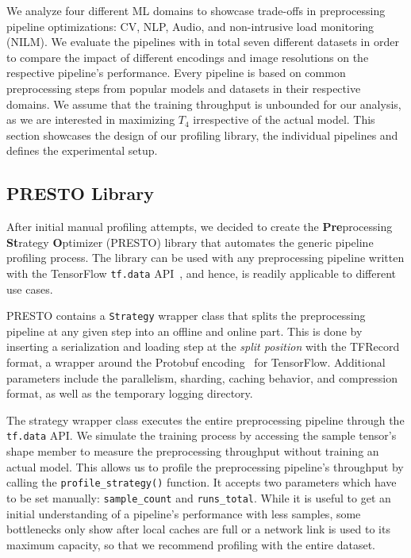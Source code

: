 We analyze four different ML domains to showcase trade-offs in preprocessing pipeline optimizations: CV, NLP, {\color{diff}Audio}, and non-intrusive load monitoring (NILM).
{\color{diff}We evaluate the pipelines with in total seven different datasets in order to compare the impact of different encodings and image resolutions on the respective pipeline's performance.}
Every pipeline is based on common preprocessing steps from popular models and datasets in their respective domains.
We assume that the training throughput is unbounded for our analysis, as we are interested in maximizing $T_4$ irrespective of the actual model.
This section showcases the design of our profiling library, the individual pipelines and defines the experimental setup.

\subsection{PRESTO Library}

After initial manual profiling attempts, we decided to create the \textbf{Pre}processing \textbf{St}rategy \textbf{O}ptimizer (PRESTO) library that automates the generic pipeline profiling process.
The library can be used with any preprocessing pipeline written with the TensorFlow \texttt{tf.data} API~\cite{murray2021tf}, and hence, is readily applicable to different use cases.

PRESTO contains a \texttt{Strategy} wrapper class that splits the preprocessing pipeline at any given step into an offline and online part.
This is done by inserting a serialization and loading step at the \textit{split position} with the TFRecord format, a wrapper around the Protobuf encoding~\cite{protobuf} for TensorFlow.
Additional parameters include the parallelism, sharding, {\color{diff}caching behavior, and compression format}, as well as the temporary logging directory.

The strategy wrapper class executes the entire preprocessing pipeline through the \texttt{tf.data} API.
We simulate the training process by accessing the sample tensor's shape member to measure the preprocessing throughput without training an actual model. 
This allows us to profile the preprocessing pipeline's throughput by calling the \texttt{profile\_strategy()} function.
It accepts two parameters which have to be set manually: \texttt{sample\_count} and \texttt{runs\_total}.
{\color{diff} While it is useful to get an initial understanding of a pipeline's performance with less samples, some bottlenecks only show after local caches are full or a network link is used to its maximum capacity, so that we recommend profiling with the entire dataset.}

